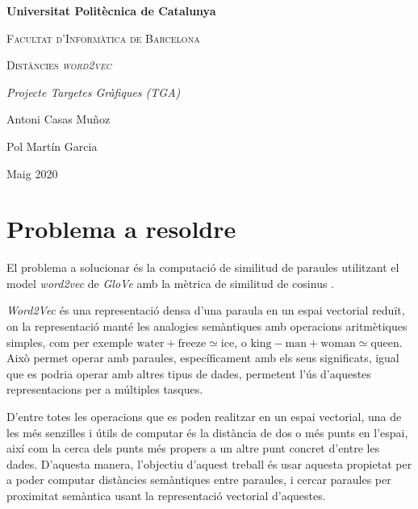 \documentclass[catalan,10pt,a4paper]{article}
\begin{document}
	\begin{titlepage}
		\centering
		{\bfseries\LARGE Universitat Politècnica de Catalunya \par}
		\vspace{1cm}
		{\scshape\Large Facultat d'Informàtica de Barcelona\par}
		\vspace{3cm}
		{\scshape\Huge Distàncies \textit{word2vec} \par}
		\vspace{3cm}
		{\itshape\Large Projecte Targetes Gràfiques (TGA) \par}
		\vfill
		{\Large Antoni Casas Muñoz \par}
		{\Large Pol Martín Garcia \par}
		\vfill
		{\Large Maig 2020 \par}
	\end{titlepage}
	
	\newpage
	
\section*{Problema a resoldre}

El problema a solucionar és la computació de similitud de paraules utilitzant el model \textit{word2vec} de \textit{GloVe} \cite{GloVeGlo18:online} amb la mètrica de similitud de cosinus \cite{Cosinesi72:online}.

\textit{Word2Vec} és una representació densa d'una paraula en un espai vectorial reduït, on la representació manté les analogies semàntiques amb operacions aritmètiques simples, com per exemple $\text{water} + \text{freeze} \simeq \text{ice}$, o $\text{king} - \text{man} + \text{woman} \simeq \text{queen}$. Això permet operar amb paraules, específicament amb els seus significats, igual que es podria operar amb altres tipus de dades, permetent l'ús d'aquestes representacions per a múltiples tasques.

D'entre totes les operacions que es poden realitzar en un espai vectorial, una de les més senzilles i útils de computar és la distància de dos o més punts en l'espai, així com la cerca dels punts més propers a un altre punt concret d'entre les dades. D'aquesta manera, l'objectiu d'aquest treball és usar aquesta propietat per a poder computar distàncies semàntiques entre paraules, i cercar paraules per proximitat semàntica usant la representació vectorial d'aquestes.
\end{document}
